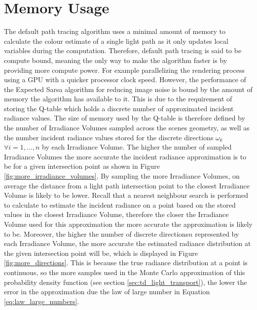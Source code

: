 \documentclass[../dissertation.tex]{subfiles}
\begin{document}
\section{Memory Usage}

The default path tracing algorithm uses a minimal amount of memory to calculate the colour estimate of a single light path as it only updates local variables during the computation. Therefore, default path tracing is said to be compute bound, meaning the only way to make the algorithm faster is by providing more compute power. For example parallelizing the rendering process using a GPU with a quicker processor clock speed. However, the performance of the Expected Sarsa algorithm for reducing image noise is bound by the amount of memory the algorithm has available to it. This is due to the requirement of storing the Q-table which holds a discrete number of approximated incident radiance values. The size of memory used by the Q-table is therefore defined by the number of Irradiance Volumes sampled across the scenes geometry, as well as the number incident radiance values stored for the discrete directions $\omega_k$ $\forall i = 1,...,n$  by each Irradiance Volume. The higher the number of sampled Irradiance Volumes the more accurate the incident radiance approximation is to be for a given intersection point as shown in Figure \ref{fig:more_irradiance_volumes}.  By sampling the more Irradiance Volumes, on average the distance from a light path intersection point to the closest Irradiance Volume is likely to be lower. Recall that a nearest neighbour search is performed to calculate to estimate the incident radiance on a point based on the stored values in the closest Irradiance Volume, therefore the closer the Irradiance Volume used for this approximation the more accurate the approximation is likely to be. Moreover, the higher the number of discrete directions$n$ represented by each Irradiance Volume, the more accurate the estimated radiance distribution at the given intersection point will be, which is displayed in Figure \ref{fig:more_directions}. This is because the true radiance distribution at a point is continuous, so the more samples used in the Monte Carlo approximation of this probability density function (see section \ref{sec:td_light_transport}), the lower the error in the approximation due the law of large number in Equation \ref{eq:law_large_numbers}. 

\end{document}
